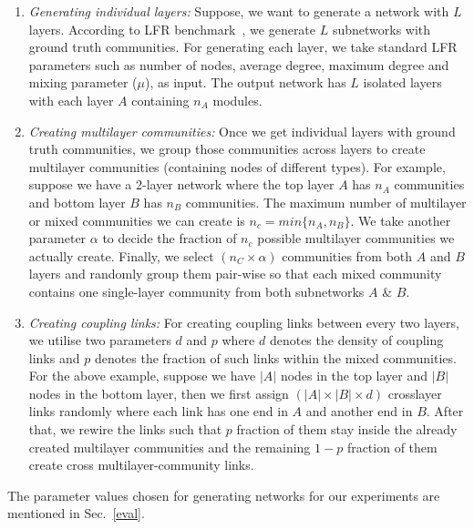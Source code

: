  \begin{enumerate}

  \item \textit{Generating individual layers:} Suppose, we want to generate a network with $L$ layers. According to LFR
  benchmark~\cite{lancichinetti2008benchmark}, we
  generate $L$ subnetworks with ground truth communities. For generating each layer, we take standard LFR parameters such as
  number of nodes, average degree, maximum degree and mixing parameter ($\mu$), as input. The output network has $L$ isolated layers with
  each layer $A$ containing $n_A$ modules.

  \item \textit{Creating multilayer communities:} Once we get individual layers with ground truth communities, we group those
  communities across layers to create multilayer communities (containing nodes of different types).
  For example, suppose we have a 2-layer network where the top layer $A$
  has $n_A$ communities and bottom layer $B$ has $n_B$ communities. The maximum number of multilayer or mixed communities we can create
  is $n_c = min\{n_A , n_B\}$. We take another parameter $\alpha$ to decide the fraction of $n_c$ possible multilayer communities
  we actually create. Finally, we select $(n_C \times \alpha)$ communities from both $A$ and $B$ layers and randomly group
  them pair-wise so that each mixed community contains one single-layer community from both subnetworks $A$ \& $B$.

 \item \textit{Creating coupling links:} For creating coupling links between every two layers,
 we utilise two parameters $d$ and $p$ where $d$ denotes the density of coupling links and $p$ denotes the fraction of such links
 within the mixed
 communities. For the above example, suppose we have $|A|$ nodes in the top layer and $|B|$ nodes in the bottom layer,
 then we first assign
 $(|A| \times |B| \times d)$ crosslayer links randomly where each link has one end in $A$ and another end in $B$.
 After that, we rewire the links such that $p$ fraction of them stay inside the already created
 multilayer communities and the remaining
 $1-p$ fraction of them create cross multilayer-community links.

\end{enumerate}

 The parameter values chosen for generating networks for our experiments are mentioned in Sec.~\ref{eval}.
%

